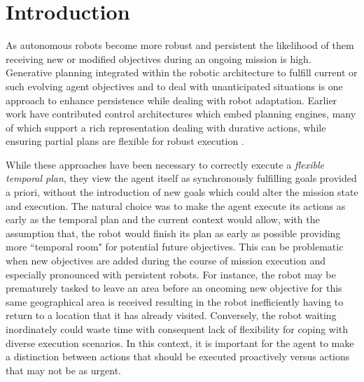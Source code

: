 \section{Introduction}
\label{sec:intro}

As autonomous robots become more robust and persistent the likelihood
of them receiving new or modified objectives during an ongoing
mission is high. Generative planning integrated within the robotic
architecture to fulfill current or such evolving agent objectives and
to deal with unanticipated situations is one approach to enhance
persistence while dealing with robot adaptation.  Earlier work
\cite{AmbrosIngerson88,Haigh98,alami:1998p820,mus98,chien99,mus04,py10}
have contributed control architectures which embed planning engines,
many of which support a rich representation dealing with durative
actions, while ensuring partial plans are flexible for robust execution
\cite{lemai-chenevier2004}.


While these approaches have been necessary to correctly execute a
\emph{flexible temporal plan}, they view the agent itself as
synchronously fulfilling goals provided a priori, without the
introduction of new goals which could alter the mission state and
execution.
The natural choice was to make the agent execute its actions as early
as the temporal plan and the current context would allow, with the
assumption that, the robot would finish its plan as early as possible
providing more ``temporal room" for potential future objectives.  This
can be problematic when new objectives are added during the course of
mission execution and especially pronounced with persistent
robots. For instance, the robot may be prematurely tasked to leave an
area before an oncoming new objective for this same geographical area
is received resulting in the robot inefficiently having to return to a
location that it has already visited. Conversely, the robot waiting
inordinately could waste time with consequent lack of flexibility for
coping with diverse execution scenarios. In this context, it is
important for the agent to make a distinction between actions that should
be executed proactively versus actions that may not be as urgent.

